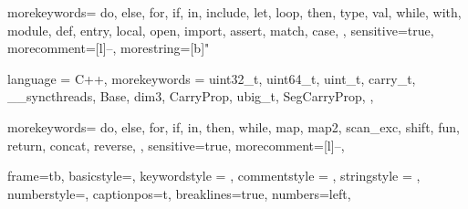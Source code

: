 
{
  morekeywords={
    do,
    else,
    for,
    if,
    in,
    include,
    let,
    loop,
    then,
    type,
    val,
    while,
    with,
    module,
    def,
    entry,
    local,
    open,
    import,
    assert,
    match,
    case,
  },
  sensitive=true, %
  morecomment=[l]{--}, %
  morestring=[b]" %
}

{
  language = C++,
  morekeywords = {
    uint32_t,
    uint64_t,
    uint_t,
    carry_t,
    __syncthreads,
    Base,
    dim3,
    CarryProp,
    ubig_t,
    SegCarryProp,
  },
}

{
  morekeywords={
    do,
    else,
    for,
    if,
    in,
    then,
    while,
    map,
    map2,
    scan_exc,
    shift,
    fun,
    return,
    concat,
    reverse,
  },
  sensitive=true,
  morecomment=[l]{--},
}

{
  frame=tb,
  basicstyle=\footnotesize\ttfamily,
  keywordstyle = \color{RoyalBlue},
  commentstyle = \color{ForestGreen},
  stringstyle = \color{purple},
  numberstyle=\scriptsize\color{darkgray},
  captionpos=t,
  breaklines=true,
  numbers=left,
}

\lstset{style=myStyle}  



